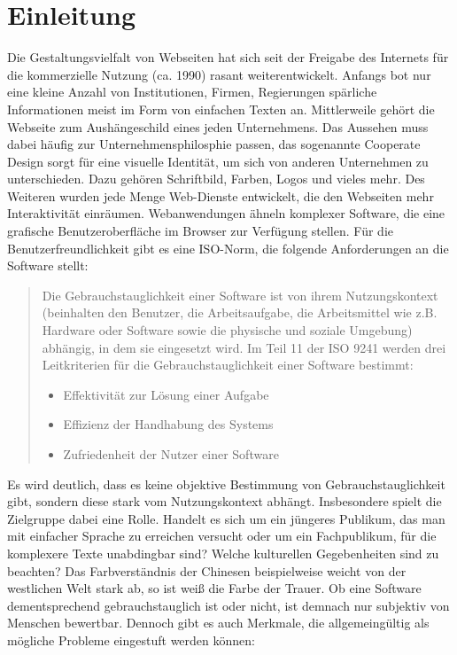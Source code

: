 \documentclass[runningheads,a4paper]{llncs}
\begin{document}
\newpage

\section{Einleitung}
Die Gestaltungsvielfalt von Webseiten hat sich seit der Freigabe des Internets für die kommerzielle Nutzung (ca. 1990) rasant weiterentwickelt. 
Anfangs bot nur eine kleine Anzahl von Institutionen, Firmen, Regierungen spärliche Informationen meist im Form von einfachen Texten an. 
Mittlerweile gehört die Webseite zum Aushängeschild eines jeden Unternehmens. 
Das Aussehen muss dabei häufig zur Unternehmensphilosphie passen, das sogenannte Cooperate Design sorgt für eine visuelle Identität, um sich von anderen Unternehmen zu unterschieden. 
Dazu gehören Schriftbild, Farben, Logos und vieles mehr.
Des Weiteren wurden jede Menge Web-Dienste entwickelt, die den Webseiten mehr Interaktivität einräumen. 
Webanwendungen ähneln komplexer Software, die eine grafische Benutzeroberfläche im Browser zur Verfügung stellen.
Für die Benutzerfreundlichkeit gibt es eine ISO-Norm, die folgende Anforderungen an die Software stellt:

\begin{quote}
Die Gebrauchstauglichkeit einer Software ist von ihrem Nutzungskontext (beinhalten den Benutzer, die Arbeitsaufgabe, die Arbeitsmittel wie z.B. Hardware oder Software sowie die physische und soziale Umgebung) abhängig, in dem sie eingesetzt wird. 
Im Teil 11 der ISO 9241 werden drei Leitkriterien für die Gebrauchstauglichkeit einer Software bestimmt:

\begin{itemize}

    \item{Effektivität zur Lösung einer Aufgabe}
    \item{Effizienz der Handhabung des Systems}
    \item{Zufriedenheit der Nutzer einer Software}
    
\end{itemize}

\end{quote}

Es wird deutlich, dass es keine objektive Bestimmung von Gebrauchstauglichkeit gibt, sondern diese stark vom Nutzungskontext abhängt. 
Insbesondere spielt die Zielgruppe dabei eine Rolle. 
Handelt es sich um ein jüngeres Publikum, das man mit einfacher Sprache zu erreichen versucht oder um ein Fachpublikum, für die komplexere Texte unabdingbar sind?
Welche kulturellen Gegebenheiten sind zu beachten? 
Das Farbverständnis der Chinesen beispielweise weicht von der westlichen Welt stark ab, so ist weiß die Farbe der Trauer.
Ob eine Software dementsprechend gebrauchstauglich ist oder nicht, ist demnach nur subjektiv von Menschen bewertbar.
Dennoch gibt es auch Merkmale, die allgemeingültig als mögliche Probleme eingestuft werden können:
\end{document}
